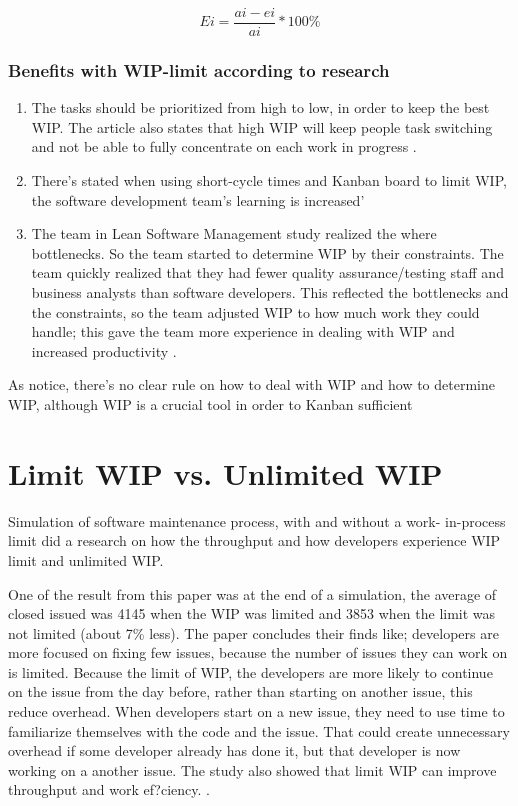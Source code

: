 \documentclass[UKenglish]{ifimaster}  %
\begin{document}
\begin{equation} \label{WIPEQ}
Ei=\frac{ai-ei}{ai}*100\%
\end{equation}

\subsubsection{Benefits with WIP-limit according to research}
\begin{enumerate}
\item The tasks should be prioritized from high to low, in order to keep the best WIP. The article also states that high WIP will keep people task switching and not be able to fully concentrate on each work in progress \parencite{Ikonen}.
\item There's stated when using short-cycle times and Kanban board to limit WIP, the software development team's learning is increased' \parencite{Joyce}
\item The team in Lean Software Management study realized the where bottlenecks. So the team started to determine WIP by their constraints. The team quickly realized that they had fewer quality assurance/testing staff and business analysts than software developers. This reflected the bottlenecks and the constraints, so the team adjusted WIP to how much work they could handle; this gave the team more experience in dealing with WIP and increased productivity \parencite{Joyce}.
\end{enumerate}

As notice, there's no clear rule on how to deal with WIP and how to determine WIP, although WIP is a crucial tool in order to Kanban sufficient

\section {Limit WIP vs. Unlimited WIP}
Simulation of software maintenance process, with and without a work- in-process limit did a research on how the throughput and how developers experience WIP limit and unlimited WIP\parencite{SMR:SMR1599}.

One of the result from this paper was at the end of a simulation, the average of closed issued was 4145 when the WIP was limited and 3853 when the limit was not limited (about 7\% less). The paper concludes their finds like; developers are more focused on fixing few issues, because the number of issues they can work on is limited.  Because the limit of WIP, the developers are more likely to continue on the issue from the day before, rather than starting on another issue, this reduce overhead. When developers start on a new issue, they need to use time to familiarize themselves with the code and the issue. That could create unnecessary overhead if some developer already has done it, but that developer is now working on a another issue. The study also showed that limit WIP can improve throughput and work ef?ciency. \parencite{SMR:SMR1599}.
\end{document}
